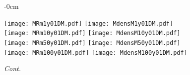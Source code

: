 \documentclass[universe,article,accept,moreauthors,pdftex]{Definitions/mdpi}
\begin{document}
\begin{figure} [H]

\begin{adjustwidth}{-\extralength}{0cm}
\centering %

{\texttt{[image: MRm1y01DM.pdf]}\vspace{3pt}
	  \texttt{[image: MdensM1y01DM.pdf]}}\\\vspace{5pt}
{\texttt{[image: MRm10y01DM.pdf]}\vspace{5pt}
	  \texttt{[image: MdensM10y01DM.pdf]}}\\\vspace{5pt}
{\texttt{[image: MRm50y01DM.pdf]}\vspace{3pt}
	  \texttt{[image: MdensM50y01DM.pdf]}}\\\vspace{5pt}
{\texttt{[image: MRm100y01DM.pdf]}\vspace{3pt}
	  \texttt{[image: MdensM100y01DM.pdf]}}\\
\end{adjustwidth}
\caption{\emph{Cont.}}
\label{fig:MRdens01DM}

\end{figure}
\end{document}
